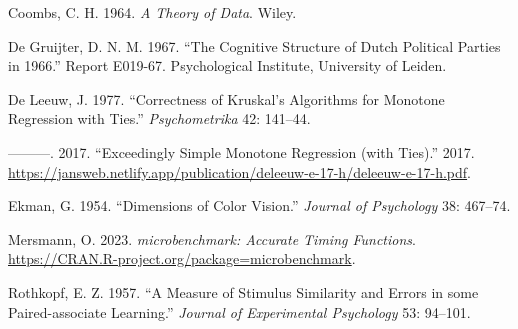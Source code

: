\documentclass[
  12pt,
]{article}
\newlength{\cslhangindent}
\newenvironment{CSLReferences}[2] %
 {\begin{list}{}{%
  \setlength{\itemindent}{0pt}
  \setlength{\leftmargin}{0pt}
  \setlength{\parsep}{0pt}
  \ifodd #1
   \setlength{\leftmargin}{\cslhangindent}
   \setlength{\itemindent}{-1\cslhangindent}
  \fi
  \setlength{\itemsep}{#2\baselineskip}}}
 {\end{list}}
\begin{document}
\label{refs}
\begin{CSLReferences}{1}{0}
Coombs, C. H. 1964. \emph{{A Theory of Data}}. Wiley.

De Gruijter, D. N. M. 1967. {``{The Cognitive Structure of Dutch Political Parties in 1966}.''} Report E019-67. Psychological Institute, University of Leiden.

De Leeuw, J. 1977. {``Correctness of Kruskal's Algorithms for Monotone Regression with Ties.''} \emph{Psychometrika} 42: 141--44.

---------. 2017. {``{Exceedingly Simple Monotone Regression (with Ties)}.''} 2017. \url{https://jansweb.netlify.app/publication/deleeuw-e-17-h/deleeuw-e-17-h.pdf}.

Ekman, G. 1954. {``{Dimensions of Color Vision}.''} \emph{Journal of Psychology} 38: 467--74.

Mersmann, O. 2023. \emph{{microbenchmark: Accurate Timing Functions}}. \url{https://CRAN.R-project.org/package=microbenchmark}.

Rothkopf, E. Z. 1957. {``{A Measure of Stimulus Similarity and Errors in some Paired-associate Learning}.''} \emph{Journal of Experimental Psychology} 53: 94--101.

\end{CSLReferences}
\end{document}
